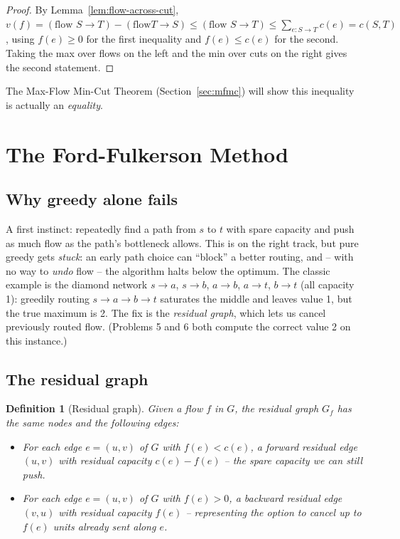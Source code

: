 \documentclass[11pt]{article}
\newtheorem{definition}[theorem]{Definition}
\begin{document}
\begin{proof}
By Lemma~\ref{lem:flow-across-cut}, $v(f) = (\text{flow }S\!\to\!T) - (\text{flow
}T\!\to\!S) \le (\text{flow }S\!\to\!T) \le \sum_{e: S\to T} c(e) = c(S,T)$, using
$f(e) \ge 0$ for the first inequality and $f(e) \le c(e)$ for the second. Taking the max
over flows on the left and the min over cuts on the right gives the second statement.
\end{proof}

The Max-Flow Min-Cut Theorem (Section~\ref{sec:mfmc}) will show this inequality is
actually an \emph{equality}.

\section{The Ford-Fulkerson Method}

\subsection{Why greedy alone fails}

A first instinct: repeatedly find a path from $s$ to $t$ with spare capacity and push as
much flow as the path's bottleneck allows. This is on the right track, but pure greedy
gets \emph{stuck}: an early path choice can ``block'' a better routing, and -- with no way
to \emph{undo} flow -- the algorithm halts below the optimum. The classic example is the
diamond network $s \to a$, $s \to b$, $a \to b$, $a \to t$, $b \to t$ (all capacity 1):
greedily routing $s \to a \to b \to t$ saturates the middle and leaves value 1, but the
true maximum is 2. The fix is the \emph{residual graph}, which lets us cancel previously
routed flow. (Problems 5 and 6 both compute the correct value 2 on this instance.)

\subsection{The residual graph}

\begin{definition}[Residual graph]
Given a flow $f$ in $G$, the \emph{residual graph} $G_f$ has the same nodes and the
following edges:
\begin{itemize}
    \item For each edge $e = (u,v)$ of $G$ with $f(e) < c(e)$, a \emph{forward} residual
    edge $(u,v)$ with \emph{residual capacity} $c(e) - f(e)$ -- the spare capacity we can
    still push.
    \item For each edge $e = (u,v)$ of $G$ with $f(e) > 0$, a \emph{backward} residual
    edge $(v,u)$ with residual capacity $f(e)$ -- representing the option to \emph{cancel}
    up to $f(e)$ units already sent along $e$.
\end{itemize}
\end{definition}
\end{document}
